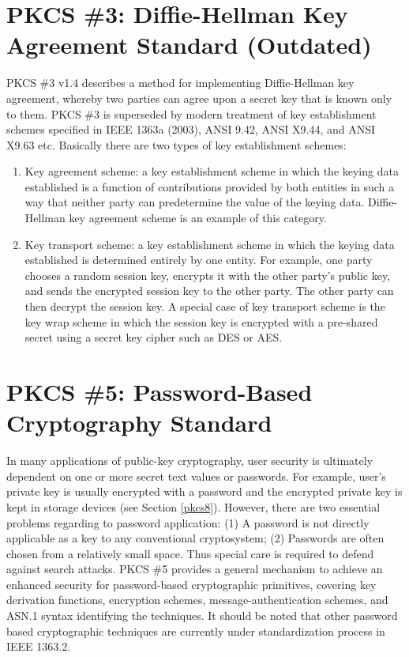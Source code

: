 \documentclass{article}
\begin{document}
\section{PKCS \#3: Diffie-Hellman Key Agreement Standard (Outdated)}
\label{pkcs3}
PKCS \#3 v1.4 describes a method for implementing Diffie-Hellman 
key agreement, whereby two parties can agree upon a secret key 
that is known only to them. 
PKCS \#3 is superseded by modern treatment of key establishment 
schemes specified in IEEE 1363a (2003), ANSI 9.42, ANSI X9.44, and
ANSI X9.63 etc. Basically there are two types of key establishment
schemes:
\begin{enumerate}
\item Key agreement scheme: a key establishment scheme in which the keying
data established is a function of contributions provided by both entities in 
such a way that neither party can predetermine the value of the keying data.
Diffie-Hellman key agreement scheme is an example of this category.
\item Key transport scheme: a key establishment scheme in which the keying
data established is determined entirely by one entity. For example, one party
chooses a random session key, encrypts it with the other party's public key,
and sends the encrypted session key to the other party. The other party 
can then decrypt the session key. A special case of key transport scheme is 
the key wrap scheme in which the session key is encrypted with a pre-shared 
secret using a secret key cipher such as DES or AES.
\end{enumerate}

\section{PKCS \#5: Password-Based Cryptography Standard}
\label{pkcs5}
In many applications of public-key cryptography, user security is 
ultimately dependent on one or more secret text values or passwords.
For example, user's private key is usually encrypted with a password
and the encrypted private key is kept in storage devices 
(see Section \ref{pkcs8}).
However, there are two essential problems regarding to password application:
(1) A password is not directly applicable as a key to any conventional 
cryptosystem; (2) Passwords are often chosen from a relatively 
small space. Thus special care is required to defend against search attacks.
PKCS \#5 provides a general mechanism to achieve an enhanced security
for password-based cryptographic primitives, covering key derivation 
functions, encryption schemes, message-authentication schemes, and 
ASN.1 syntax identifying the techniques. It should be noted that 
other password based cryptographic techniques are currently 
under standardization process in IEEE 1363.2.
\end{document}
